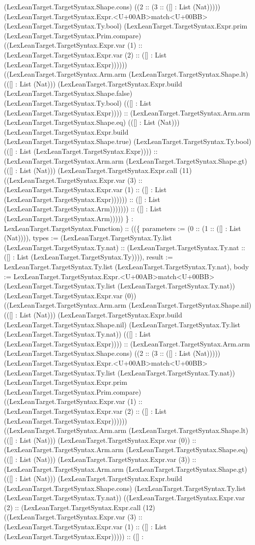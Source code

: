 \documentclass[11pt]{article}
\begin{document}
(LexLeanTarget.TargetSyntax.Shape.cons) ((2 :: (3 :: ([] : List (Nat))))) (LexLeanTarget.TargetSyntax.Expr.<U+00AB>match<U+00BB> (LexLeanTarget.TargetSyntax.Ty.bool) (LexLeanTarget.TargetSyntax.Expr.prim (LexLeanTarget.TargetSyntax.Prim.compare) ((LexLeanTarget.TargetSyntax.Expr.var (1) :: (LexLeanTarget.TargetSyntax.Expr.var (2) :: ([] : List (LexLeanTarget.TargetSyntax.Expr)))))) ((LexLeanTarget.TargetSyntax.Arm.arm (LexLeanTarget.TargetSyntax.Shape.lt) (([] : List (Nat))) (LexLeanTarget.TargetSyntax.Expr.build (LexLeanTarget.TargetSyntax.Shape.false) (LexLeanTarget.TargetSyntax.Ty.bool) (([] : List (LexLeanTarget.TargetSyntax.Expr)))) :: (LexLeanTarget.TargetSyntax.Arm.arm (LexLeanTarget.TargetSyntax.Shape.eq) (([] : List (Nat))) (LexLeanTarget.TargetSyntax.Expr.build (LexLeanTarget.TargetSyntax.Shape.true) (LexLeanTarget.TargetSyntax.Ty.bool) (([] : List (LexLeanTarget.TargetSyntax.Expr)))) :: (LexLeanTarget.TargetSyntax.Arm.arm (LexLeanTarget.TargetSyntax.Shape.gt) (([] : List (Nat))) (LexLeanTarget.TargetSyntax.Expr.call (11) ((LexLeanTarget.TargetSyntax.Expr.var (3) :: (LexLeanTarget.TargetSyntax.Expr.var (1) :: ([] : List (LexLeanTarget.TargetSyntax.Expr)))))) :: ([] : List (LexLeanTarget.TargetSyntax.Arm))))))) :: ([] : List (LexLeanTarget.TargetSyntax.Arm))))) \} : LexLeanTarget.TargetSyntax.Function) :: ((\{ parameters := (0 :: (1 :: ([] : List (Nat)))), types := (LexLeanTarget.TargetSyntax.Ty.list (LexLeanTarget.TargetSyntax.Ty.nat) :: (LexLeanTarget.TargetSyntax.Ty.nat :: ([] : List (LexLeanTarget.TargetSyntax.Ty)))), result := LexLeanTarget.TargetSyntax.Ty.list (LexLeanTarget.TargetSyntax.Ty.nat), body := LexLeanTarget.TargetSyntax.Expr.<U+00AB>match<U+00BB> (LexLeanTarget.TargetSyntax.Ty.list (LexLeanTarget.TargetSyntax.Ty.nat)) (LexLeanTarget.TargetSyntax.Expr.var (0)) ((LexLeanTarget.TargetSyntax.Arm.arm (LexLeanTarget.TargetSyntax.Shape.nil) (([] : List (Nat))) (LexLeanTarget.TargetSyntax.Expr.build (LexLeanTarget.TargetSyntax.Shape.nil) (LexLeanTarget.TargetSyntax.Ty.list (LexLeanTarget.TargetSyntax.Ty.nat)) (([] : List (LexLeanTarget.TargetSyntax.Expr)))) :: (LexLeanTarget.TargetSyntax.Arm.arm (LexLeanTarget.TargetSyntax.Shape.cons) ((2 :: (3 :: ([] : List (Nat))))) (LexLeanTarget.TargetSyntax.Expr.<U+00AB>match<U+00BB> (LexLeanTarget.TargetSyntax.Ty.list (LexLeanTarget.TargetSyntax.Ty.nat)) (LexLeanTarget.TargetSyntax.Expr.prim (LexLeanTarget.TargetSyntax.Prim.compare) ((LexLeanTarget.TargetSyntax.Expr.var (1) :: (LexLeanTarget.TargetSyntax.Expr.var (2) :: ([] : List (LexLeanTarget.TargetSyntax.Expr)))))) ((LexLeanTarget.TargetSyntax.Arm.arm (LexLeanTarget.TargetSyntax.Shape.lt) (([] : List (Nat))) (LexLeanTarget.TargetSyntax.Expr.var (0)) :: (LexLeanTarget.TargetSyntax.Arm.arm (LexLeanTarget.TargetSyntax.Shape.eq) (([] : List (Nat))) (LexLeanTarget.TargetSyntax.Expr.var (3)) :: (LexLeanTarget.TargetSyntax.Arm.arm (LexLeanTarget.TargetSyntax.Shape.gt) (([] : List (Nat))) (LexLeanTarget.TargetSyntax.Expr.build (LexLeanTarget.TargetSyntax.Shape.cons) (LexLeanTarget.TargetSyntax.Ty.list (LexLeanTarget.TargetSyntax.Ty.nat)) ((LexLeanTarget.TargetSyntax.Expr.var (2) :: (LexLeanTarget.TargetSyntax.Expr.call (12) ((LexLeanTarget.TargetSyntax.Expr.var (3) :: (LexLeanTarget.TargetSyntax.Expr.var (1) :: ([] : List (LexLeanTarget.TargetSyntax.Expr))))) :: ([] : 
\end{document}
